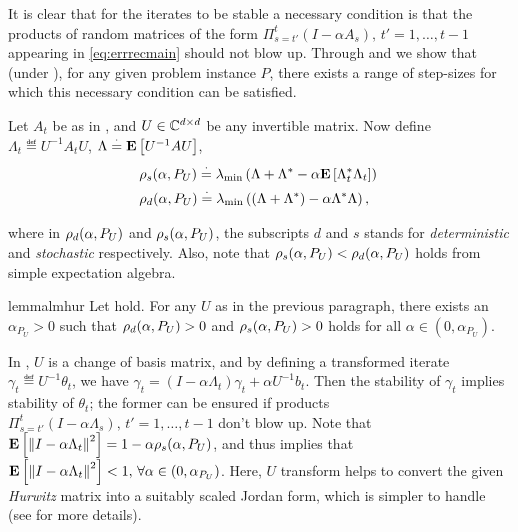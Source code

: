 \iffalse
It is clear that for the iterates to be stable a necessary condition is that the products of random matrices  of the form $\Pi_{s=t'}^{t}(I-\alpha A_s),\,t'=1,\ldots,t-1$ appearing in \eqref{eq:errrecmain} should not blow up. Through  and  we show that (under ), for any given problem instance $P$, there exists a range of step-sizes for which this necessary condition can be satisfied.
\begin{definition}\label{def:spect}
Let $A_t$ be as in , and $U\in\mathbb{C}^{d \times d}$ be any invertible matrix. Now define $\Lambda_t\eqdef U^{-1}A_t U$, $\Lambda\stackrel{\cdot}{=} \mathbf{E}\left[U^{-1}A U\right]$,
\begin{align*}
&\rho_s(\alpha,P_U)\stackrel{\cdot}{=} \lambda_{\min}\left(\Lambda+\Lambda^*-\alpha \mathbf{E}\left[\Lambda_t^*\Lambda_t\right]\right)\,\\
& \rho_d(\alpha,P_U)\stackrel{\cdot}{=} \lambda_{\min}\left((\Lambda+\Lambda^*)-\alpha \Lambda^* \Lambda\right),
\end{align*}
\end{definition}
where in $\rho_d(\alpha,P_U)$ and $\rho_s(\alpha,P_U)$, the subscripts $d$ and $s$ stands for \emph{deterministic} and \emph{stochastic} respectively. Also, note that $\rho_s(\alpha,P_U)<\rho_d(\alpha,P_U)$ holds from simple expectation algebra.
\begin{restatable}{lemma}{lmhur}\label{lm:hur}
Let  hold.
For any $U$ as in the previous paragraph,
there exists an $\alpha_{P_U}>0$ such that $\rho_d(\alpha,P_U)>0$ and $\rho_s(\alpha,P_U)>0$ holds for all $\alpha \in (0,\alpha_{P_U})$. 
\end{restatable}
In , $U$ is a change of basis matrix, and by defining a transformed iterate $\gamma_t\eqdef U^{-1}\theta_t$, we have $\gamma_t=(I-\alpha \Lambda_t) \gamma_t +\alpha U^{-1}b_t$. Then the stability of $\gamma_t$ implies stability of $\theta_t$; the former can be ensured if products $\Pi_{s=t'}^t (I-\alpha \Lambda_s),\,t'=1,\ldots,t-1$ don't blow up. Note that $\mathbf{E}\left[\left\| I-\alpha \Lambda_t\right\|^2\right]=1-\alpha \rho_s(\alpha,P_U)$, and thus  implies that $\mathbf{E}\left[\left\| I-\alpha \Lambda_t\right\|^2\right]<1,\,\forall \alpha\in (0,\alpha_{P_U})$. Here, $U$ transform helps to convert the given \emph{Hurwitz} matrix into a suitably scaled Jordan form, which is simpler to handle (see  for more details).

